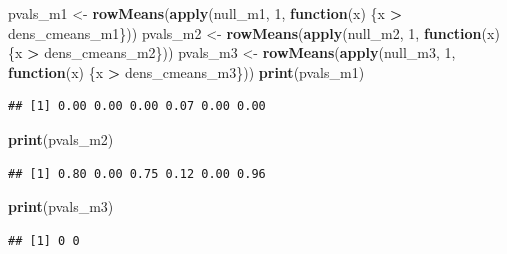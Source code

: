 \documentclass[]{article}
\newenvironment{Shaded}{\begin{snugshade}}{\end{snugshade}}
\newcommand{\ControlFlowTok}[1]{\textcolor[rgb]{0.13,0.29,0.53}{\textbf{#1}}}
\newcommand{\DecValTok}[1]{\textcolor[rgb]{0.00,0.00,0.81}{#1}}
\newcommand{\KeywordTok}[1]{\textcolor[rgb]{0.13,0.29,0.53}{\textbf{#1}}}
\newcommand{\NormalTok}[1]{#1}
\newcommand{\OperatorTok}[1]{\textcolor[rgb]{0.81,0.36,0.00}{\textbf{#1}}}
\newcommand{\StringTok}[1]{\textcolor[rgb]{0.31,0.60,0.02}{#1}}
\begin{document}
\begin{Shaded}
\begin{Highlighting}[]
\NormalTok{pvals_m1 <-}\StringTok{ }\KeywordTok{rowMeans}\NormalTok{(}\KeywordTok{apply}\NormalTok{(null_m1, }\DecValTok{1}\NormalTok{, }\ControlFlowTok{function}\NormalTok{(x) \{x }\OperatorTok{>}\StringTok{ }\NormalTok{dens_cmeans_m1\}))}
\NormalTok{pvals_m2 <-}\StringTok{ }\KeywordTok{rowMeans}\NormalTok{(}\KeywordTok{apply}\NormalTok{(null_m2, }\DecValTok{1}\NormalTok{, }\ControlFlowTok{function}\NormalTok{(x) \{x }\OperatorTok{>}\StringTok{ }\NormalTok{dens_cmeans_m2\}))}
\NormalTok{pvals_m3 <-}\StringTok{ }\KeywordTok{rowMeans}\NormalTok{(}\KeywordTok{apply}\NormalTok{(null_m3, }\DecValTok{1}\NormalTok{, }\ControlFlowTok{function}\NormalTok{(x) \{x }\OperatorTok{>}\StringTok{ }\NormalTok{dens_cmeans_m3\}))}
\KeywordTok{print}\NormalTok{(pvals_m1)}
\end{Highlighting}
\end{Shaded}

\begin{verbatim}
## [1] 0.00 0.00 0.00 0.07 0.00 0.00
\end{verbatim}

\begin{Shaded}
\begin{Highlighting}[]
\KeywordTok{print}\NormalTok{(pvals_m2)}
\end{Highlighting}
\end{Shaded}

\begin{verbatim}
## [1] 0.80 0.00 0.75 0.12 0.00 0.96
\end{verbatim}

\begin{Shaded}
\begin{Highlighting}[]
\KeywordTok{print}\NormalTok{(pvals_m3)}
\end{Highlighting}
\end{Shaded}

\begin{verbatim}
## [1] 0 0
\end{verbatim}
\end{document}
